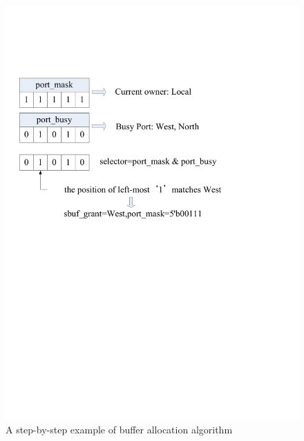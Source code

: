 \documentclass[10pt,conference]{IEEEtran}
\begin{document}
\begin{figure}
\centering\includegraphics[scale=0.5]{figures/Algorithm.pdf}
\caption{A step-by-step example of buffer allocation algorithm}\label{Algorithm}
\end{figure}
\end{document}
